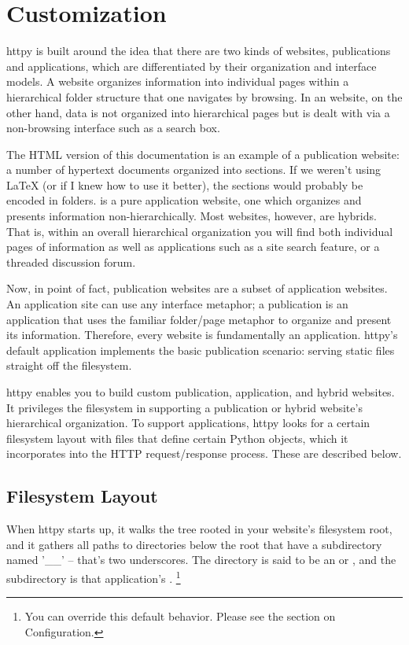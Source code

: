 \chapter{Customization}

httpy is built around the idea that there are two kinds of websites,
publications and applications, which are differentiated by their organization
and interface models. A  website organizes information into
individual pages within a hierarchical folder structure that one navigates by
browsing. In an  website, on the other hand, data is not
organized into hierarchical pages but is dealt with via a non-browsing interface
such as a search box.

The HTML version of this documentation is an example of a publication website: a
number of hypertext documents organized into sections. If we weren't using LaTeX
(or if I knew how to use it better), the sections would probably be encoded in
folders.  is a pure application
website, one which organizes and presents information non-hierarchically. Most
websites, however, are hybrids. That is, within an overall hierarchical
organization you will find both individual pages of information as well as
applications such as a site search feature, or a threaded discussion forum.

Now, in point of fact, publication websites are a subset of application
websites. An application site can use any interface metaphor; a publication is
an application that uses the familiar folder/page metaphor to organize and
present its information. Therefore, every website is fundamentally an
application. httpy's default application implements the basic publication
scenario: serving static files straight off the filesystem.

httpy enables you to build custom publication, application, and hybrid websites.
It privileges the filesystem in supporting a publication or hybrid website's
hierarchical organization. To support applications, httpy looks for a certain
filesystem layout with files that define certain Python objects, which it
incorporates into the HTTP request/response process. These are described below.



\section{Filesystem Layout}

When httpy starts up, it walks the tree rooted in your website's filesystem
root, and it gathers all paths to directories below the root that have a
subdirectory named '__' -- that's two underscores. The directory is said to be
an  or , and the subdirectory is that application's
. \footnote{You can override this default behavior. Please
see the section on Configuration.}

